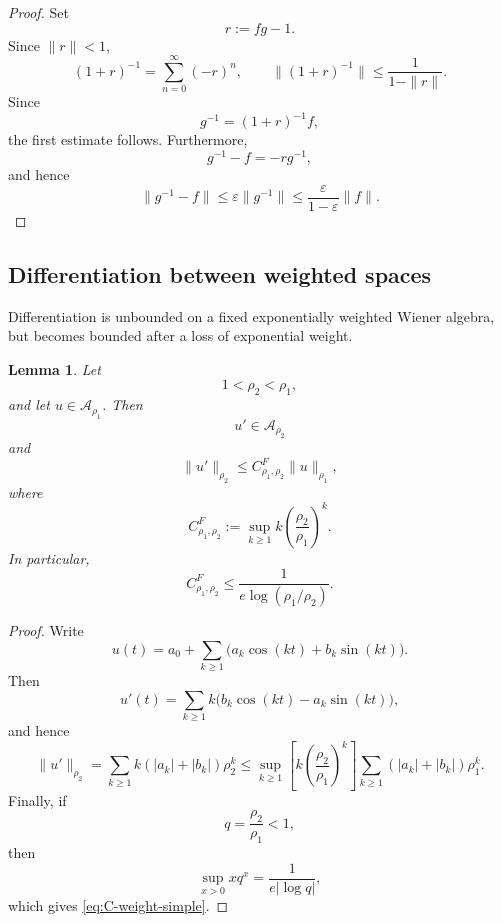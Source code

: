 \documentclass[11pt,a4paper]{amsart}
\newtheorem{lemma}[theorem]{Lemma}
\begin{document}
\begin{proof}
	Set
	\[
	r:=fg-1.
	\]
	Since $\|r\|<1$,
	\[
	(1+r)^{-1}
	=
	\sum_{n=0}^\infty(-r)^n,
	\qquad
	\|(1+r)^{-1}\|
	\le
	\frac1{1-\|r\|}.
	\]
	Since
	\[
	g^{-1}=(1+r)^{-1}f,
	\]
	the first estimate follows. Furthermore,
	\[
	g^{-1}-f=-rg^{-1},
	\]
	and hence
	\[
	\|g^{-1}-f\|
	\le
	\varepsilon\|g^{-1}\|
	\le
	\frac{\varepsilon}{1-\varepsilon}\|f\|.
	\]
\end{proof}


\subsection{Differentiation between weighted spaces}

Differentiation is unbounded on a fixed exponentially weighted
Wiener algebra, but becomes bounded after a loss of exponential
weight.

\begin{lemma}\label{lem:derivative-A}
	Let
	\[
	1<\rho_2<\rho_1,
	\]
	and let $u\in\mathcal A_{\rho_1}$. Then
	\[
	u'\in\mathcal A_{\rho_2}
	\]
	and
	\begin{equation}\label{eq:derivative-A}
		\|u'\|_{\rho_2}
		\le
		C^F_{\rho_1,\rho_2}\|u\|_{\rho_1},
	\end{equation}
	where
	\begin{equation}\label{eq:C-weight}
		C^F_{\rho_1,\rho_2}
		:=
		\sup_{k\ge1}
		k
		\left(
		\frac{\rho_2}{\rho_1}
		\right)^k.
	\end{equation}
	In particular,
	\begin{equation}\label{eq:C-weight-simple}
		C^F_{\rho_1,\rho_2}\le\frac{1}{e\log(\rho_1/\rho_2)
		}.
	\end{equation}
\end{lemma}

\begin{proof}
	Write
	\[
	u(t)
	=
	a_0+\sum_{k\ge1}
	\bigl(a_k\cos(kt)+b_k\sin(kt)\bigr).
	\]
	Then
	\[
	u'(t)
	=
	\sum_{k\ge1}
	k\bigl(
	b_k\cos(kt)-a_k\sin(kt)
	\bigr),
	\]
	and hence
	\[
		\|u'\|_{\rho_2}=\sum_{k\ge1}k(|a_k|+|b_k|)\rho_2^k\le
		\sup_{k\ge1}\left[k\left(\frac{\rho_2}{\rho_1}\right)^k\right]\sum_{k\ge1}
		(|a_k|+|b_k|)\rho_1^k.
	\]
	Finally, if
	\[
	q=\frac{\rho_2}{\rho_1}<1,
	\]
	then
	\[
	\sup_{x>0}xq^x
	=
	\frac1{e|\log q|},
	\]
	which gives \eqref{eq:C-weight-simple}.
\end{proof}
\end{document}
